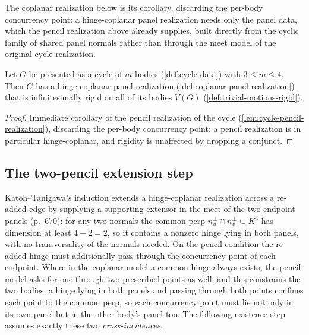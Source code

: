 The coplanar realization below is its corollary, discarding the
per-body concurrency point: a hinge-coplanar panel realization needs
only the panel data, which the pencil realization above already
supplies, built directly from the cyclic family of shared panel
normals rather than through the meet model of the original cycle
realization.

\begin{lemma}
  \label{lem:cycle-coplanar-realization}
  \leanok
  Let $G$ be presented as a cycle of $m$ bodies (\cref{def:cycle-data})
  with $3 \le m \le 4$. Then $G$ has a hinge-coplanar panel realization
  (\cref{def:coplanar-panel-realization}) that is infinitesimally rigid on
  all of its bodies $V(G)$ (\cref{def:trivial-motions-rigid}).
\end{lemma}
\begin{proof}
  \leanok
  Immediate corollary of the pencil realization of the cycle
  (\cref{lem:cycle-pencil-realization}), discarding the per-body concurrency point: a pencil
  realization is in particular hinge-coplanar, and rigidity is unaffected by dropping a conjunct.
\end{proof}

\subsection{The two-pencil extension step}
\label{sec:pencil-extension}

Katoh--Tanigawa's induction extends a hinge-coplanar realization across
a re-added edge by supplying a supporting extensor in the meet of the
two endpoint panels (p.~670): for any two normals the common perp
$n_u^{\perp} \cap n_v^{\perp} \subseteq K^4$ has dimension at least
$4 - 2 = 2$, so it contains a nonzero hinge lying in both panels, with
no transversality of the normals needed. On the pencil condition the
re-added hinge must additionally pass through the concurrency point of
each endpoint. Where in the coplanar model a common hinge always
exists, the pencil model asks for one through two prescribed points as
well, and this constrains the two bodies: a hinge lying in both panels
and passing through both points confines each point to the common perp,
so each concurrency point must lie not only in its own panel but in the
other body's panel too. The following existence step assumes exactly
these two \emph{cross-incidences}.

